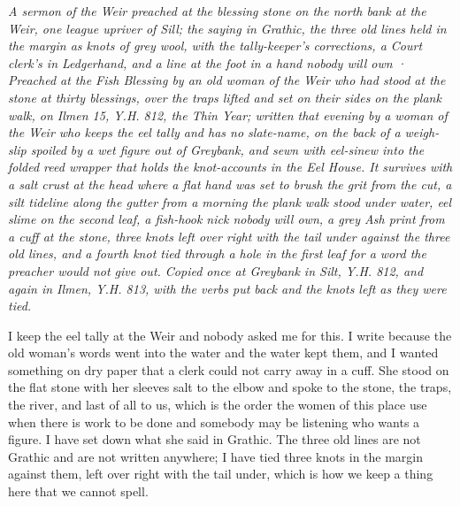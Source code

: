 \documentclass{design/chronicle}
\begin{document}
\clearpage{}
{\centering\FellFont\itshape\footnotesize\color{faded} A sermon of the Weir preached at the blessing stone on the north bank at the Weir, one league upriver of Sill; the saying in Grathic, the three old lines held in the margin as knots of grey wool, with the tally-keeper’s corrections, a Court clerk’s in Ledgerhand, and a line at the foot in a hand nobody will own · Preached at the Fish Blessing by an old woman of the Weir who had stood at the stone at thirty blessings, over the traps lifted and set on their sides on the plank walk, on Ilmen 15, Y.H. 812, the Thin Year; written that evening by a woman of the Weir who keeps the eel tally and has no slate-name, on the back of a weigh-slip spoiled by a wet figure out of Greybank, and sewn with eel-sinew into the folded reed wrapper that holds the knot-accounts in the Eel House. It survives with a salt crust at the head where a flat hand was set to brush the grit from the cut, a silt tideline along the gutter from a morning the plank walk stood under water, eel slime on the second leaf, a fish-hook nick nobody will own, a grey Ash print from a cuff at the stone, three knots left over right with the tail under against the three old lines, and a fourth knot tied through a hole in the first leaf for a word the preacher would not give out. Copied once at Greybank in Silt, Y.H. 812, and again in Ilmen, Y.H. 813, with the verbs put back and the knots left as they were tied.\par}\medskip
I keep the eel tally at the Weir and nobody asked me for this. I write because the old woman’s words went into the water and the water kept them, and I wanted something on dry paper that a clerk could not carry away in a cuff. She stood on the flat stone with her sleeves salt to the elbow and spoke to the stone, the traps, the river, and last of all to us, which is the order the women of this place use when there is work to be done and somebody may be listening who wants a figure. I have set down what she said in Grathic. The three old lines are not Grathic and are not written anywhere; I have tied three knots in the margin against them, left over right with the tail under, which is how we keep a thing here that we cannot spell.
\end{document}
